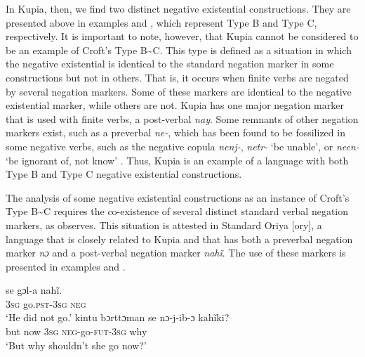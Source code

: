 \documentclass[output=paper,colorlinks,citecolor=brown]{langscibook}
\begin{document}
In Kupia, then, we find two distinct negative existential
constructions. They are presented above in examples
 and , which
represent Type B and Type C, respectively. It is important to note,
however, that Kupia cannot be considered to be an example of Croft's Type
B{\textasciitilde}C. This type is defined as a situation in which the
negative existential is identical to the standard negation marker in some
constructions but not in others. That is, it occurs when finite verbs are
negated by several negation markers. Some of these markers are identical to
the negative existential marker, while others are not. Kupia has
one major negation marker that is used with finite verbs, a post-verbal
\textit{nay}. Some remnants of other negation markers exist, such as a
preverbal \textit{ne-}, which has been found to be fossilized in some
negative verbs, such as the negative copula \textit{nenj-}, \textit{netr-}
`be unable', or \textit{neen-} `be ignorant of, not know'
\parencite[310]{Christmas1973a}. Thus, Kupia is an example of a language with both Type B and Type C negative existential constructions. 

The analysis of some negative existential constructions as an instance of
Croft's Type B{\textasciitilde}C requires the co-existence of several
distinct standard verbal negation markers, as \citet[1329]{Veselinova2014}
observes. This situation is attested in Standard Oriya [ory], a
language that is closely related to Kupia and that has both a preverbal
negation marker \textit{nɔ} and a post-verbal negation marker
\textit{nahĩ}. The use of these markers is presented in examples
 and .
%
\begin{exe}\ex
{}
\begin{xlist}
    \ex\label{ex:ieur-oriya-henotgo}
    \gll se gɔl-a nahĩ. \\
      \textsc{3sg}  go.\textsc{pst-3sg} \textsc{neg} \\
    \glt `He did not go.'
\ex\label{ex:ieur-oriya-shouldgo}
\gll kintu bɔrttɔman se nɔ-j-ib-ɔ kahĩki?\\
but now \textsc{3sg}  \textsc{neg}-go-\textsc{fut-3sg}  why\\
\glt `But why shouldn't she go now?’
\end{xlist}\end{exe}
\end{document}
